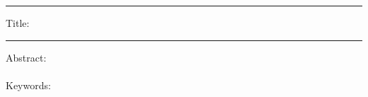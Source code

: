 %

\thispagestyle{empty}				%
\rule[1ex]{\textwidth}{0.5pt}
Title:
\begin{center}
  \textbf{\IhrTitelEN}
\end{center}
\vspace*{0.5cm}
\rule[1ex]{\textwidth}{0.5pt}
Abstract:\\[0.5cm]
\IhreZusammenfassungEN\\[0.5cm]
Keywords: \IhreSchluesselwoerter
\clearpage